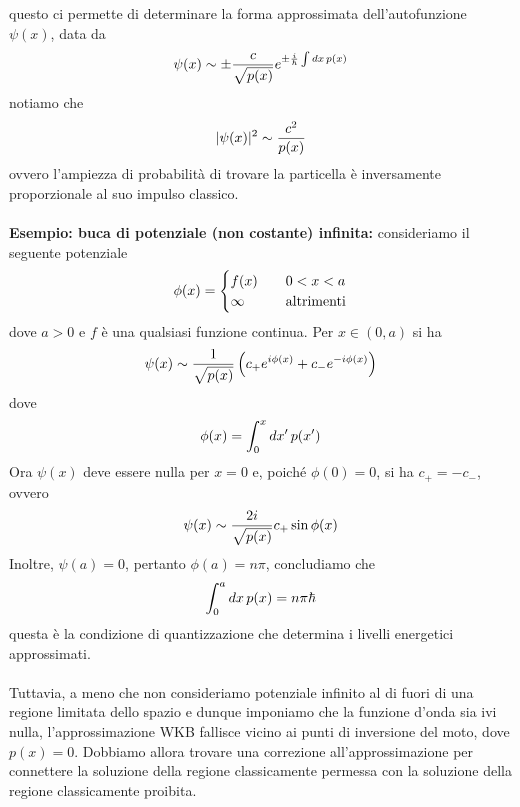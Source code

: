 \documentclass{article}
\begin{document}
questo ci permette di determinare la forma approssimata dell'autofunzione $\psi(x)$, data da
\begin{gather}
    \psi(x) \sim \pm\frac{c}{\sqrt{p(x)}}e^{\pm\frac{i}{\hbar}\int dx \, p(x)} \notag
\end{gather}
notiamo che
\begin{gather}
    |\psi(x)|^2 \sim \frac{c^2}{p(x)} \notag
\end{gather}
ovvero l'ampiezza di probabilità di trovare la particella è inversamente proporzionale al suo impulso classico. \\ \\
\textbf{Esempio: buca di potenziale (non costante) infinita:} consideriamo il seguente potenziale
\begin{gather}
    \phi(x) = \begin{cases}
        f(x) \quad &0 < x < a \\
        \infty \quad &\text{altrimenti}
    \end{cases} \notag 
\end{gather}
dove $a > 0$ e $f$ è una qualsiasi funzione continua. Per $x \in (0, a)$ si ha
\begin{gather}
    \psi(x) \sim \frac{1}{\sqrt{p(x)}}\left( c_+e^{i\phi(x)} + c_-e^{-i\phi(x)} \right) \notag 
\end{gather}
dove
\begin{gather}
    \phi(x) = \int_0^x dx' \, p(x') \notag
\end{gather}
Ora $\psi(x)$ deve essere nulla per $x = 0$ e, poiché $\phi(0) = 0$, si ha $c_+ = - c_-$, ovvero
\begin{gather}
    \psi(x) \sim \frac{2i}{\sqrt{p(x)}}c_+\sin\phi(x) \notag
\end{gather}
Inoltre, $\psi(a) = 0$, pertanto $\phi(a) = n\pi$, concludiamo che
\begin{gather}
    \int_0^a dx \, p(x) = n\pi\hbar \notag
\end{gather}
questa è la condizione di quantizzazione che determina i livelli energetici approssimati. \\ \\
Tuttavia, a meno che non consideriamo potenziale infinito al di fuori di una regione limitata dello spazio e dunque imponiamo che la funzione d'onda sia ivi nulla, l'approssimazione WKB fallisce vicino ai punti di inversione del moto, dove $p(x) = 0$. Dobbiamo allora trovare una correzione all'approssimazione per connettere la soluzione della regione classicamente permessa con la soluzione della regione classicamente proibita. \\
\end{document}
